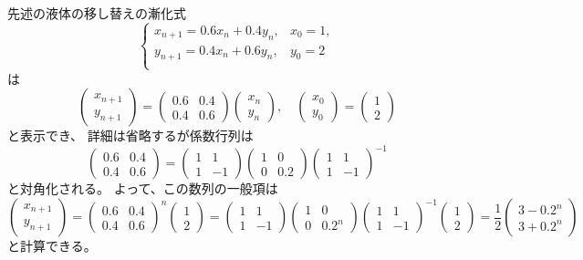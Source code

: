 \begin{example}
先述の液体の移し替えの漸化式
$$
\begin{cases}
x_{n+1} = 0.6 x_n+0.4 y_n, & x_0 = 1, \\
y_{n+1} = 0.4 x_n+0.6 y_n, & y_0 = 2 \\
\end{cases}
$$
は
$$
\begin{pmatrix}x_{n+1} \\ y_{n+1}\end{pmatrix}
= \begin{pmatrix}0.6 & 0.4 \\ 0.4 & 0.6\end{pmatrix}\begin{pmatrix}x_n \\ y_n\end{pmatrix},
\quad \begin{pmatrix}x_0 \\ y_0\end{pmatrix} = \begin{pmatrix}1 \\ 2\end{pmatrix}
$$
と表示でき、
詳細は省略するが係数行列は
$$
\begin{pmatrix}0.6 & 0.4 \\ 0.4 & 0.6\end{pmatrix}
= \begin{pmatrix}1 & 1 \\ 1 & -1\end{pmatrix}\begin{pmatrix}1 & 0 \\ 0 & 0.2\end{pmatrix}\begin{pmatrix}1 & 1 \\ 1 & -1\end{pmatrix}^{-1}
$$
と対角化される。
よって、この数列の一般項は
$$
\begin{pmatrix}x_{n+1} \\ y_{n+1}\end{pmatrix}
= \begin{pmatrix}0.6 & 0.4 \\ 0.4 & 0.6\end{pmatrix}^n\begin{pmatrix}1 \\ 2\end{pmatrix}
= \begin{pmatrix}1 & 1 \\ 1 & -1\end{pmatrix}\begin{pmatrix}1 & 0 \\ 0 & 0.2^n\end{pmatrix}\begin{pmatrix}1 & 1 \\ 1 & -1\end{pmatrix}^{-1}\begin{pmatrix}1 \\ 2\end{pmatrix}
= \frac{1}{2}\begin{pmatrix}3-0.2^n \\ 3+0.2^n\end{pmatrix}
$$
と計算できる。
\end{example}

